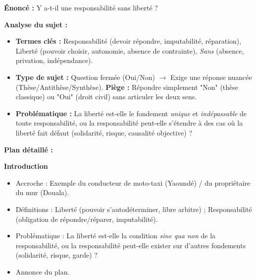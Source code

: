 \documentclass[11pt]{article}
\begin{document}
\begin{exoresolu}
\textbf{Énoncé :} \og Y a-t-il une responsabilité sans liberté ? \fg{}

\textbf{Analyse du sujet :}
\begin{itemize}
    \item \textbf{Termes clés :} Responsabilité (devoir répondre, imputabilité, réparation), Liberté (pouvoir choisir, autonomie, absence de contrainte), \emph{Sans} (absence, privation, indépendance).
    \item \textbf{Type de sujet :} Question fermée (Oui/Non) $\rightarrow$ Exige une réponse nuancée (Thèse/Antithèse/Synthèse). \textbf{Piège :} Répondre simplement "Non" (thèse classique) ou "Oui" (droit civil) sans articuler les deux sens.
    \item \textbf{Problématique :} La liberté est-elle le fondement \emph{unique} et \emph{indépassable} de toute responsabilité, ou la responsabilité peut-elle s'étendre à des cas où la liberté fait défaut (solidarité, risque, causalité objective) ?
\end{itemize}

\textbf{Plan détaillé :}

\textbf{Introduction}
\begin{itemize}
    \item Accroche : Exemple du conducteur de moto-taxi (Yaoundé) / du propriétaire du mur (Douala).
    \item Définitions : Liberté (pouvoir s'autodéterminer, libre arbitre) ; Responsabilité (obligation de répondre/réparer, imputabilité).
    \item Problématique : La liberté est-elle la condition \emph{sine qua non} de la responsabilité, ou la responsabilité peut-elle exister sur d'autres fondements (solidarité, risque, garde) ?
    \item Annonce du plan.
\end{itemize}


\end{exoresolu}
\end{document}
